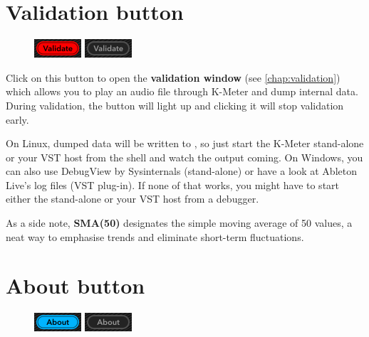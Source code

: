 \section{Validation button}
\label{sec:validation_button}

\begin{figure}
\includegraphics[scale=\screenshotscale,clip]{include/images/button_validate_on.png}
\newline \vspace{-0.9\baselineskip}
\includegraphics[scale=\screenshotscale,clip]{include/images/button_validate_off.png}
\end{figure}

Click on this button to open the \textbf{validation window} (see
\ref{chap:validation}) which allows you to play an audio file through
K-Meter and dump internal data.  During validation, the button will
light up and clicking it will stop validation early.

On Linux, dumped data will be written to , so just start
the K-Meter stand-alone or your VST host from the shell and watch the
output coming.  On Windows, you can also use DebugView by Sysinternals
(stand-alone) or have a look at Ableton Live's log files (VST
plug-in).  If none of that works, you might have to start either the
stand-alone or your VST host from a debugger.

As a side note, \textbf{SMA(50)} designates the simple moving average
of 50 values, a neat way to emphasise trends and eliminate short-term
fluctuations.

\section{About button}

\begin{figure}
\includegraphics[scale=\screenshotscale,clip]{include/images/button_about_on.png}
\newline \vspace{-0.9\baselineskip}
\includegraphics[scale=\screenshotscale,clip]{include/images/button_about_off.png}
\end{figure}

